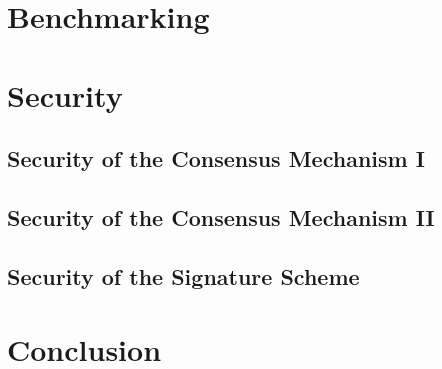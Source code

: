 \documentclass[a4paper, 12pt]{book}
\begin{document}
\chapter{Benchmarking} \label{Cha:Ben}




\chapter{Security} \label{Cha:Sec}




\section{Security of the Consensus Mechanism I }\label{Sec:ConSec}



\section{Security of the Consensus Mechanism II }\label{Sec:SecLsu}




\section{Security of the Signature Scheme}\label{Sec:SSS}





\chapter*{Conclusion} \label{Cha:Con}


\end{document}
